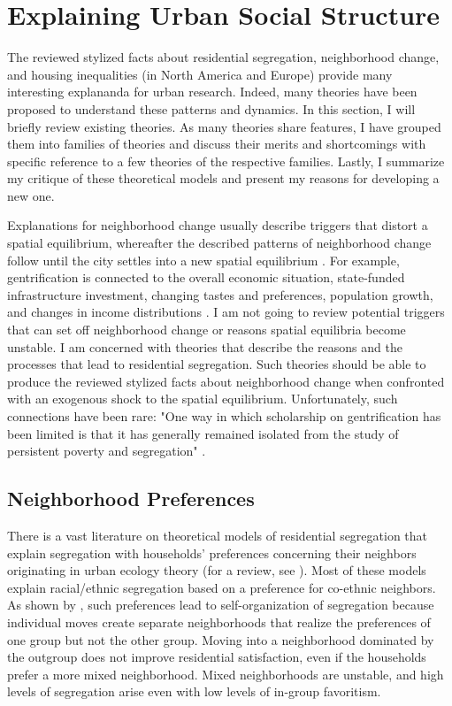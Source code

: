 \section{Explaining Urban Social Structure}


The reviewed stylized facts about residential segregation, neighborhood change, and housing inequalities (in North America and Europe) provide many interesting explananda for urban research. Indeed, many theories have been proposed to understand these patterns and dynamics. In this section, I will briefly review existing theories. As many theories share features, I have grouped them into families of theories and discuss their merits and shortcomings with specific reference to a few theories of the respective families. Lastly, I summarize my critique of these theoretical models and present my reasons for developing a new one.

Explanations for neighborhood change usually describe triggers that distort a spatial equilibrium, whereafter the described patterns of neighborhood change follow until the city settles into a new spatial equilibrium \citep{galsterNatureNeighbourhood2001}. For example, gentrification is connected to the overall economic situation, state-funded infrastructure investment, changing tastes and preferences, population growth, and changes in income distributions \citep{leyAlternativeExplanationsInnerCity1986, zukinGentrificationCultureCapital1987}. I am not going to review potential triggers that can set off neighborhood change or reasons spatial equilibria become unstable. I am concerned with theories that describe the reasons and the processes that lead to residential segregation. Such theories should be able to produce the reviewed stylized facts about neighborhood change when confronted with an exogenous shock to the spatial equilibrium. Unfortunately, such connections have been rare: "One way in which scholarship on gentrification has been limited is that it has generally remained isolated from the study of persistent poverty and segregation" \citep[227]{hwangThingsChangeThings2016}.



\subsection{Neighborhood Preferences}

There is a vast literature on theoretical models of residential segregation that explain segregation with households' preferences concerning their neighbors originating in urban ecology theory (for a review, see \cite{fossettEthnicPreferencesSocial2006}). Most of these models explain racial/ethnic segregation based on a preference for co-ethnic neighbors. As shown by \citet{schellingDynamicModelsSegregation1971}, such preferences lead to self-organization of segregation because individual moves create separate neighborhoods that realize the preferences of one group but not the other group. Moving into a neighborhood dominated by the outgroup does not improve residential satisfaction, even if the households prefer a more mixed neighborhood. Mixed neighborhoods are unstable, and high levels of segregation arise even with low levels of in-group favoritism.

